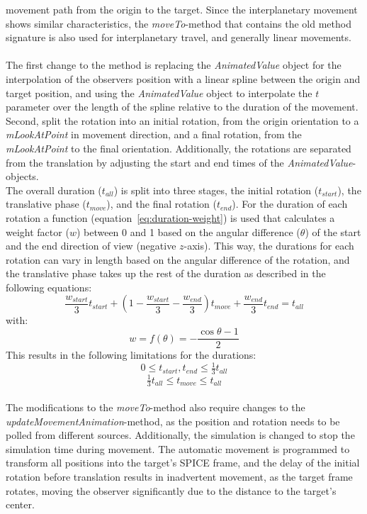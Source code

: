movement path from the origin to the target.
Since the interplanetary movement shows similar characteristics, the \textit{moveTo}-method that contains the old
method signature is also used for interplanetary travel, and generally linear movements.
\\
\\
The first change to the method is replacing the \textit{AnimatedValue} object for the interpolation of the observers
position with a linear spline between the origin and target position, and using the \textit{AnimatedValue} object to
interpolate the $t$ parameter over the length of the spline relative to the duration of the movement.
\\
Second, split the rotation into an initial rotation, from the origin orientation to a \textit{mLookAtPoint} in
movement direction, and a final rotation, from the \textit{mLookAtPoint} to the final orientation.
Additionally, the rotations are separated from the translation by adjusting the start and end times of the
\textit{AnimatedValue}-objects.
\\
The overall duration ($t_{all}$) is split into three stages, the initial rotation ($t_{start}$), the translative phase
($t_{move}$), and the final rotation ($t_{end}$).
For the duration of each rotation a function (equation~\ref{eq:duration-weight}) is used that calculates a weight
factor ($w$) between 0 and 1 based on the angular difference ($\theta$) of the start and the end direction of view
(negative $z$-axis).
This way, the durations for each rotation can vary in length based on the angular difference of the rotation, and the
translative phase takes up the rest of the duration as described in the following equations:
\begin{equation}
    \label{eq:duration-timings}
    \frac{w_{start}}{3} t_{start} + (1 - \frac{w_{start}}{3} - \frac{w_{end}}{3}) t_{move} +
    \frac{w_{end}}{3} t_{end} = t_{all}
\end{equation}
with:
\begin{equation}
    \label{eq:duration-weight}
    w = f(\theta) = - \frac{\cos{\theta} - 1}{2}
\end{equation}
This results in the following limitations for the durations:
\begin{equation}
    \label{eq:duration-result-rot}
    0 \leq t_{start}, t_{end} \leq \tfrac{1}{3} t_{all}
\end{equation}
\begin{equation}
    \label{eq:duration-result-mov}
    \tfrac{1}{3} t_{all} \leq t_{move} \leq t_{all}
\end{equation}
\\
The modifications to the \textit{moveTo}-method also require changes to the \textit{updateMovementAnimation}-method,
as the position and rotation needs to be polled from different sources.
Additionally, the simulation is changed to stop the simulation time during movement.
The automatic movement is programmed to transform all positions into the target's SPICE frame, and the delay of the
initial rotation before translation results in inadvertent movement, as the target frame rotates, moving the observer
significantly due to the distance to the target's center.

